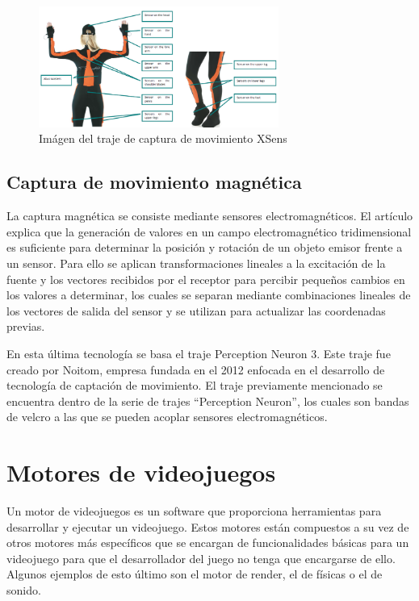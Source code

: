 \begin{figure}[H]
    \centering
    \includegraphics[width=0.7\textwidth]{Imagenes/Bitmap/XSens.png}
    \caption[Imágen del traje de captura de movimiento XSens]{Imágen del traje de captura de movimiento XSens \footnotemark }
    \label{fig:XSensTraje}
\end{figure}


\subsection{Captura de movimiento magnética}
La captura magnética se consiste mediante sensores electromagnéticos.
El artículo \cite{EMS} explica que la generación de valores en un campo electromagnético tridimensional es suficiente para determinar la posición y rotación de un objeto emisor frente a un sensor.
Para ello se aplican transformaciones lineales a la excitación de la fuente y los vectores recibidos por el receptor para percibir pequeños cambios en los valores a determinar, los cuales se separan mediante combinaciones lineales de los vectores de salida del sensor y se utilizan para actualizar las coordenadas previas.

En esta última tecnología se basa el traje Perception Neuron 3.
Este traje fue creado por Noitom, empresa fundada en el 2012 enfocada en el desarrollo de tecnología de captación de movimiento.
El traje previamente mencionado se encuentra dentro de la serie de trajes ``Perception Neuron'', los cuales son bandas de velcro a las que se pueden acoplar sensores electromagnéticos.

\section{Motores de videojuegos}
Un motor de videojuegos es un software que proporciona herramientas para desarrollar y ejecutar un videojuego.
Estos motores están compuestos a su vez de otros motores más específicos que se encargan de funcionalidades básicas para un videojuego para que el desarrollador del juego no tenga que encargarse de ello. Algunos ejemplos de esto último son el motor de render, el de físicas o el de sonido.

